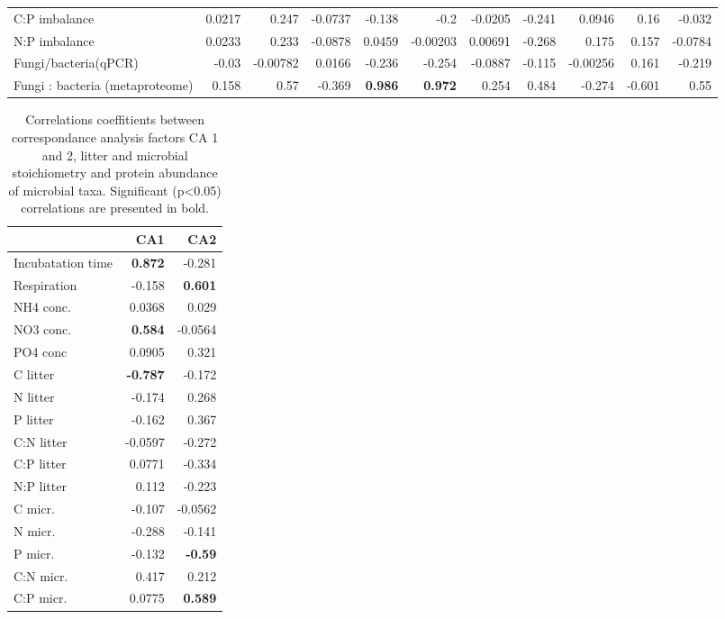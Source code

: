 \documentclass[10pt]{article}
\begin{document}
\begin{flushleft}
\begin{landscape}
\begin{table}[h!]
{\begin{tabular}{lrrrrrrrrrr}
  C:P imbalance & 0.0217 & 0.247 & -0.0737 & -0.138 & -0.2 & -0.0205 & -0.241 & 0.0946 & 0.16 & -0.032 \\ 
  N:P imbalance & 0.0233 & 0.233 & -0.0878 & 0.0459 & -0.00203 & 0.00691 & -0.268 & 0.175 & 0.157 & -0.0784 \\ 
  Fungi/bacteria(qPCR) & -0.03 & -0.00782 & 0.0166 & -0.236 & -0.254 & -0.0887 & -0.115 & -0.00256 & 0.161 & -0.219 \\ 
  Fungi : bacteria (metaproteome) & 0.158 & 0.57 & -0.369 & \textbf{ 0.986 } & \textbf{ 0.972 } & 0.254 & 0.484 & -0.274 & -0.601 & 0.55 \\ 
   \hline
\end{tabular}
}
\end{table}\end{landscape}

\begin{table}[h!]
\centering
\caption{Correlations coeffitients between correspondance analysis factors CA 1 and 2, litter and microbial stoichiometry and protein abundance of microbial taxa. Significant (p\textless 0.05) correlations are presented in bold.} 
\label{catab}
{\small
\begin{tabular}{lrr}
  \hline
 & CA1 & CA2 \\ 
  \hline
Incubatation time & \textbf{ 0.872 } & -0.281 \\ 
  Respiration & -0.158 & \textbf{ 0.601 } \\ 
  NH4 conc. & 0.0368 & 0.029 \\ 
  NO3 conc. & \textbf{ 0.584 } & -0.0564 \\ 
  PO4 conc & 0.0905 & 0.321 \\ 
  C litter & \textbf{ -0.787 } & -0.172 \\ 
  N litter & -0.174 & 0.268 \\ 
  P litter & -0.162 & 0.367 \\ 
  C:N litter & -0.0597 & -0.272 \\ 
  C:P litter & 0.0771 & -0.334 \\ 
  N:P litter & 0.112 & -0.223 \\ 
  C micr. & -0.107 & -0.0562 \\ 
  N micr. & -0.288 & -0.141 \\ 
  P micr. & -0.132 & \textbf{ -0.59 } \\ 
  C:N micr. & 0.417 & 0.212 \\ 
  C:P micr. & 0.0775 & \textbf{ 0.589 } \\ 

\end{tabular}}
\end{table}
\end{flushleft}
\end{document}

